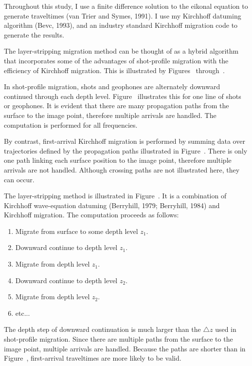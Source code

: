 Throughout this study, I use a finite difference solution to the 
eikonal equation to generate traveltimes (van Trier and Symes, 1991).
I use my Kirchhoff datuming
algorithm (Bevc, 1993), and an industry standard Kirchhoff
migration code to generate the results.


The layer-stripping migration method can be thought of as a hybrid 
algorithm that incorporates some of the advantages of shot-profile
migration with the efficiency of Kirchhoff migration.
This is illustrated by Figures~ through~.

In shot-profile migration, shots and geophones are
alternately downward continued through each depth level.
Figure~ illustrates this for one line of shots or geophones.  
It is evident that there are many propagation paths from the surface
to the image point, therefore multiple arrivals are handled.
The computation is performed for all frequencies.

By contrast, first-arrival Kirchhoff migration is performed 
by summing data over trajectories defined by the propagation paths
illustrated in Figure~. There is only one path linking
each surface position to the image point, therefore multiple arrivals are
not handled. Although crossing paths are not illustrated here, they can occur.

The layer-stripping method is illustrated in Figure~.
It is a combination of Kirchhoff wave-equation datuming 
(Berryhill, 1979; Berryhill, 1984) and Kirchhoff migration. 
The computation proceeds as follows:
\begin{enumerate}
	\item Migrate from surface to some depth level $z_1$.
	\item Downward continue to depth level $z_1$.
	\item Migrate from depth level $z_1$.
	\item Downward continue to depth level $z_2$.
	\item Migrate from depth level $z_2$.
	\item etc...
\end{enumerate}
The depth step of downward continuation is much larger than the
$\triangle z$ used in shot-profile migration. Since
there are multiple paths from the surface to the image point,
multiple arrivals are handled. Because the paths are shorter than
in Figure~, first-arrival traveltimes are more likely to 
be valid.

